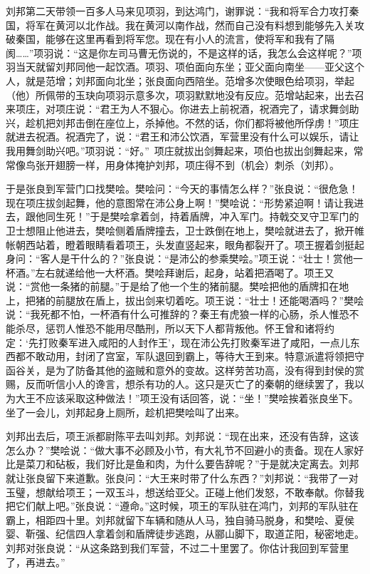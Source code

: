 \documentclass[12pt,UTF-8,openany]{ctexbook}
\begin{document}
\begin{normalsize}
    刘邦第二天带领一百多人马来见项羽，到达鸿门，谢罪说：“我和将军合力攻打秦国，将军在黄河以北作战。我在黄河以南作战，然而自己没有料想到能够先入关攻破秦国，能够在这里再看到将军您。现在有小人的流言，使将军和我有了隔阂……”项羽说：“这是你左司马曹无伤说的，不是这样的话，我怎么会这样呢？”项羽当天就留刘邦同他一起饮酒。项羽、项伯面向东坐；亚父面向南坐——亚父这个人，就是范增；刘邦面向北坐；张良面向西陪坐。范增多次使眼色给项羽，举起（他）所佩带的玉玦向项羽示意多次，项羽默默地没有反应。范增站起来，出去召来项庄，对项庄说：“君王为人不狠心。你进去上前祝酒，祝酒完了，请求舞剑助兴，趁机把刘邦击倒在座位上，杀掉他。不然的话，你们都将被他所俘虏！”项庄就进去祝酒。祝酒完了，说：“君王和沛公饮酒，军营里没有什么可以娱乐，请让我用舞剑助兴吧。”项羽说：“好。” 项庄就拔出剑舞起来，项伯也拔出剑舞起来，常常像鸟张开翅膀一样，用身体掩护刘邦，项庄得不到（机会）刺杀（刘邦）。
    
    于是张良到军营门口找樊哙。樊哙问：“今天的事情怎么样？”张良说：“很危急！现在项庄拔剑起舞，他的意图常在沛公身上啊！”樊哙说：“形势紧迫啊！请让我进去，跟他同生死！”于是樊哙拿着剑，持着盾牌，冲入军门。持戟交叉守卫军门的卫士想阻止他进去，樊哙侧着盾牌撞去，卫士跌倒在地上，樊哙就进去了，掀开帷帐朝西站着，瞪着眼睛看着项王，头发直竖起来，眼角都裂开了。项王握着剑挺起身问：“客人是干什么的？”张良说：“是沛公的参乘樊哙。”项王说：“壮士！赏他一杯酒。”左右就递给他一大杯酒。樊哙拜谢后，起身，站着把酒喝了。项王又说：“赏他一条猪的前腿。”于是给了他一个生的猪前腿。樊哙把他的盾牌扣在地上，把猪的前腿放在盾上，拔出剑来切着吃。项王说：“壮士！还能喝酒吗？”樊哙说：“我死都不怕，一杯酒有什么可推辞的？秦王有虎狼一样的心肠，杀人惟恐不能杀尽，惩罚人惟恐不能用尽酷刑，所以天下人都背叛他。怀王曾和诸将约定：‘先打败秦军进入咸阳的人封作王’，现在沛公先打败秦军进了咸阳，一点儿东西都不敢动用，封闭了宫室，军队退回到霸上，等待大王到来。特意派遣将领把守函谷关，是为了防备其他的盗贼和意外的变故。这样劳苦功高，没有得到封侯的赏赐，反而听信小人的谗言，想杀有功的人。这只是灭亡了的秦朝的继续罢了，我以为大王不应该采取这种做法！”项王没有话回答，说：“坐！”樊哙挨着张良坐下。坐了一会儿，刘邦起身上厕所，趁机把樊哙叫了出来。
    
    刘邦出去后，项王派都尉陈平去叫刘邦。刘邦说：“现在出来，还没有告辞，这该怎么办？”樊哙说：“做大事不必顾及小节，有大礼节不回避小的责备。现在人家好比是菜刀和砧板，我们好比是鱼和肉，为什么要告辞呢？”于是就决定离去。刘邦就让张良留下来道歉。张良问：“大王来时带了什么东西？”刘邦说：“我带了一对玉璧，想献给项王；一双玉斗，想送给亚父。正碰上他们发怒，不敢奉献。你替我把它们献上吧。”张良说：“遵命。”这时候，项王的军队驻在鸿门，刘邦的军队驻在霸上，相距四十里。刘邦就留下车辆和随从人马，独自骑马脱身，和樊哙、夏侯婴、靳强、纪信四人拿着剑和盾牌徒步逃跑，从郦山脚下，取道芷阳，秘密地走。刘邦对张良说：“从这条路到我们军营，不过二十里罢了。你估计我回到军营里了，再进去。”
    

\end{normalsize}
\end{document}
